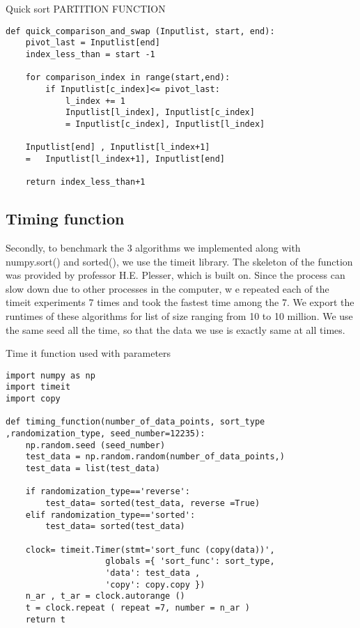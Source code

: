 \documentclass[sigconf,  natbib, screen]{acmart}
\begin{document}
\begin{listing}
  \caption{Quick sort PARTITION FUNCTION}
  \label{lst:quick_partition}

\begin{verbatim}
def quick_comparison_and_swap (Inputlist, start, end): 
    pivot_last = Inputlist[end]
    index_less_than = start -1
    
    for comparison_index in range(start,end):
        if Inputlist[c_index]<= pivot_last:
            l_index += 1
            Inputlist[l_index], Inputlist[c_index]
            = Inputlist[c_index], Inputlist[l_index]  
            
    Inputlist[end] , Inputlist[l_index+1] 
    =   Inputlist[l_index+1], Inputlist[end]  

    return index_less_than+1  
\end{verbatim}
\end{listing}

\subsection{Timing function}\label{sec:timing function}

Secondly, to benchmark the 3 algorithms we  implemented along with numpy.sort() and sorted(), we use the timeit library. The skeleton of the 
function was provided by professor H.E. Plesser, which is built on. Since the process can slow down due to other processes in the computer, w
e repeated each of the timeit experiments 7 times and took the fastest time among the 7. We export the runtimes of these algorithms for 
list of size ranging from 10 to 10 million. We use the same seed all the time, so that the data we use is exactly same at all times.

\begin{listing}
  \caption{Time it function used with parameters}
  \label{lst:time_it function}

\begin{verbatim}
import numpy as np
import timeit
import copy

def timing_function(number_of_data_points, sort_type
,randomization_type, seed_number=12235):
    np.random.seed (seed_number)
    test_data = np.random.random(number_of_data_points,)
    test_data = list(test_data)

    if randomization_type=='reverse':
        test_data= sorted(test_data, reverse =True)
    elif randomization_type=='sorted':
        test_data= sorted(test_data)

    clock= timeit.Timer(stmt='sort_func (copy(data))', 
                    globals ={ 'sort_func': sort_type,
                    'data': test_data ,
                    'copy': copy.copy })
    n_ar , t_ar = clock.autorange ()
    t = clock.repeat ( repeat =7, number = n_ar )
    return t
\end{verbatim}
\end{listing}
\end{document}
